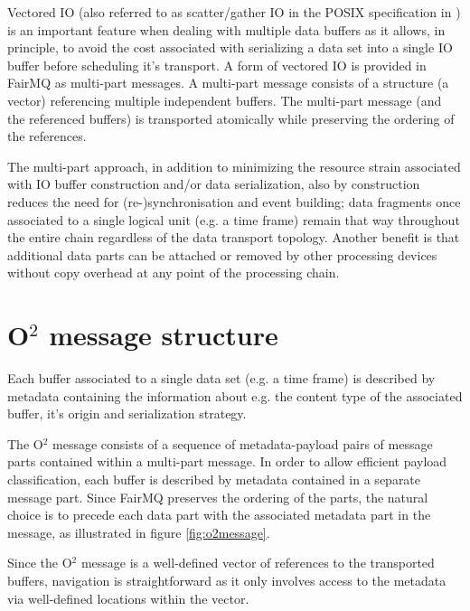 \documentclass[a4paper,twoside]{article}
\def\O2{O$^2$}
\begin{document}
Vectored IO (also referred to as scatter/gather IO in the POSIX specification in \cite{posix}) is an important feature when dealing with multiple data buffers as it allows, in principle, to avoid the cost associated with serializing a data set into a single IO buffer before scheduling it's transport.
A form of vectored IO is provided in FairMQ as multi-part messages. A multi-part message consists of a structure (a vector) referencing multiple independent buffers. The multi-part message (and the referenced buffers) is transported atomically while preserving the ordering of the references.

The multi-part approach, in addition to minimizing the resource strain associated with IO buffer construction and/or data serialization, also by construction reduces the need for (re-)synchronisation and event building; data fragments once associated to a single logical unit (e.g. a time frame) remain that way throughout the entire chain regardless of the data transport topology. Another benefit is that additional data parts can be attached or removed by other processing devices without copy overhead at any point of the processing chain.

\section{\O2 message structure}

Each buffer associated to a single data set (e.g. a time frame) is described by metadata containing the information about e.g. the content type of the associated buffer, it's origin and serialization strategy.

The \O2 message consists of a sequence of metadata-payload pairs of message parts contained within a multi-part message. In order to allow efficient payload classification, each buffer is described by metadata contained in a separate message part. Since FairMQ preserves the ordering of the parts, the natural choice is to precede each data part with the associated metadata part in the message, as illustrated in figure \ref{fig:o2message}. 

Since the \O2 message is a well-defined vector of references to the transported buffers, navigation is straightforward as it only involves access to the metadata via well-defined locations within the vector.
\end{document}
